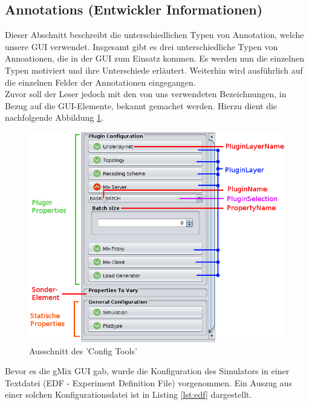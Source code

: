 \documentclass[a4paper, 11pt]{article} %
\begin{document}

\newpage
\subsection{Annotations (Entwickler Informationen)} %
\label{sub:annotations}
Dieser Abschnitt beschreibt die unterschiedlichen Typen von Annotation, welche unsere GUI verwendet. Insgesamt gibt es drei unterschiedliche Typen von Annoationen, die in der GUI zum Einsatz kommen. Es werden nun die einzelnen Typen motiviert und ihre Unterschiede erläutert. Weiterhin wird ausführlich auf die einzelnen Felder der Annotationen eingegangen.\\

Zuvor soll der Leser jedoch mit den von uns verwendeten Bezeichnungen, in Bezug auf die GUI-Elemente, bekannt gemachet werden. Hierzu dient die nachfolgende Abbildung \ref{fig:guielements}. 

\begin{figure}[!htp]

\includegraphics[scale=0.56]{img/configtool_edit.png}

\caption{Ausschnitt des 'Config Tools'}
\label{fig:guielements}
\end{figure}

Bevor es die gMix GUI gab, wurde die Konfiguration des Simulators in einer Textdatei (EDF - Experiment Definition File) vorgenommen. Ein Auszug aus einer solchen Konfigurationsdatei ist in Listing \ref{lst:edf} dargestellt. 
\end{document}
